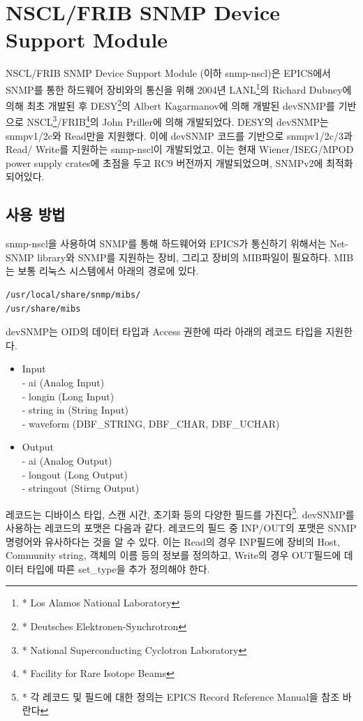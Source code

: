 \documentclass[11pt
  , a4paper
  , article
  , oneside
]{memoir}
\begin{document}
\section{NSCL/FRIB SNMP Device Support Module}
NSCL/FRIB SNMP Device Support Module (이하 snmp-nscl)은 EPICS에서 SNMP를 통한 하드웨어 장비와의 통신을 위해 2004년 LANL\footnote{* Los Alamos National Laboratory}의 Richard Dubney에 의해 최초 개발된 후 DESY\footnote{* Deutsches Elektronen-Synchrotron}의 Albert Kagarmanov에 의해 개발된 devSNMP를 기반으로 NSCL\footnote{* National Superconducting Cyclotron Laboratory}/FRIB\footnote{* Facility for Rare Isotope Beams}의 John Priller에 의해 개발되었다. DESY의 devSNMP는 snmpv1/2c와 Read만을 지원했다. 이에 devSNMP 코드를 기반으로 snmpv1/2c/3과 Read/ Write를 지원하는 snmp-nscl이 개발되었고, 이는 현재 Wiener/ISEG/MPOD power supply crates에 초점을 두고 RC9 버전까지 개발되었으며, SNMPv2에 최적화 되어있다\citep{devsnmp}. 

\subsection{사용 방법}
snmp-nscl을 사용하여 SNMP를 통해 하드웨어와 EPICS가 통신하기 위해서는 Net-SNMP library와 SNMP를 지원하는 장비, 그리고 장비의 MIB파일이 필요하다. MIB는 보통 리눅스 시스템에서 아래의 경로에 있다.

\begin{lstlisting}[style=termstyle]
/usr/local/share/snmp/mibs/ 
/usr/share/mibs
\end{lstlisting}

devSNMP는 OID의 데이터 타입과 Access 권한에 따라 아래의 레코드 타입을 지원한다.

\begin{itemize}
\item Input\\
 - ai (Analog Input)\\
 - longin (Long Input)\\
 - string in (String Input)\\
 - waveform (DBF\_STRING, DBF\_CHAR, DBF\_UCHAR)
 
\item Output\\
 - ai (Analog Output)\\
 - longout (Long Output)\\
 - ­stringout (Stirng Output)
\end{itemize}

레코드는 디바이스 타입, 스캔 시간, 초기화 등의 다양한 필드를 가진다\footnote{* 각 레코드 및 필드에 대한 정의는 EPICS Record Reference Manual\citep{record}을 참조 바란다}. devSNMP를 사용하는 레코드의 포맷은 다음과 같다. 레코드의 필드 중 INP/OUT의 포맷은 SNMP 명령어와 유사하다는 것을 알 수 있다. 이는 Read의 경우 INP필드에 장비의 Host, Community string, 객체의 이름 등의 정보를 정의하고, Write의 경우 OUT필드에 데이터 타입에 따른 set\_type을 추가 정의해야 한다.
\end{document}
